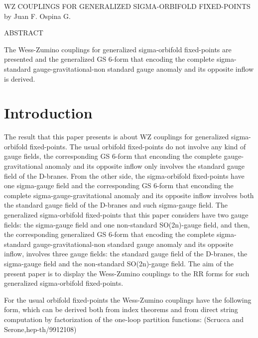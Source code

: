 \documentclass[a4paper,a4paper]{article}
\begin{document}
\begin{center}
WZ COUPLINGS FOR GENERALIZED SIGMA-ORBIFOLD FIXED-POINTS \\ [.25in]
by Juan F. Ospina G.
\end{center}
\begin{center}
ABSTRACT \\ [.25in]
\end{center}
The Wess-Zumino couplings for generalized sigma-orbifold fixed-points  are presented and the generalized GS 6-form that encoding the complete sigma-standard gauge-gravitational-non standard gauge anomaly and its opposite inflow is derived.


\section{Introduction}
The result that this paper presents is about WZ couplings for generalized sigma-orbifold fixed-points. The usual orbifold fixed-points do not involve any kind of  gauge fields, the corresponding GS 6-form that enconding the complete gauge-gravitational anomaly and its opposite inflow only involves the standard gauge field of the D-branes.
From the other side, the sigma-orbifold fixed-points  have one sigma-gauge  field and  the corresponding GS 6-form that enconding the complete sigma-gauge-gravitational anomaly and its opposite inflow involves both the standard gauge field of the D-branes and such sigma-gauge field. 
The generalized sigma-orbifold fixed-points that this paper considers have two gauge fields: the sigma-gauge field and one non-standard SO(2n)-gauge field, and then, the corresponding generalized GS 6-form that encoding the complete sigma-standard gauge-gravitational-non standard gauge anomaly and its opposite inflow, involves three gauge fields: the standard gauge field of the D-branes, the sigma-gauge field and the non-standard SO(2n)-gauge field.  
The aim of the present paper is to display the Wess-Zumino couplings to the
RR forms for such generalized sigma-orbifold fixed-points.

For the usual orbifold fixed-points the Wess-Zumino couplings have the following form, which can be derived both from index theorems and from direct string computation by factorization of the one-loop partition functions: (Scrucca and Serone,hep-th/9912108)  

\begin{center}
{  \coordHE{} }
\end{center}
\end{document}
